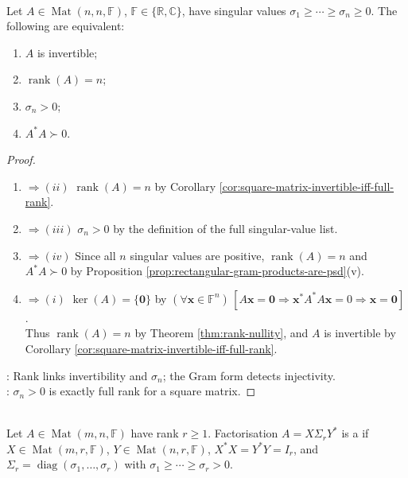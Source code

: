 \begin{corollary} \label{cor:square-invertibility-singular-value-dictionary} \\
Let $A\in\operatorname{Mat}(n,n,\mathbb{F})$, $\mathbb{F}\in\{\mathbb{R},\mathbb{C}\}$, have singular values $\sigma_1\geq\cdots\geq\sigma_n\geq0$. The following are equivalent:
\begin{enumerate}[label=(\roman*)]
\setlength{\itemsep}{0pt}
\item $A$ is invertible;
\item $\operatorname{rank}(A)=n$;
\item $\sigma_n>0$;
\item $A^*A\succ0$.
\end{enumerate}
\begin{proof}
\begin{enumerate}[label=(\roman*)]
\setlength{\itemsep}{0pt}
\item[$(i)$] $\Rightarrow (ii)$ $\operatorname{rank}(A)=n$ by Corollary \ref{cor:square-matrix-invertible-iff-full-rank}.
\item[$(ii)$] $\Rightarrow (iii)$ $\sigma_n>0$ by the definition of the full singular-value list.
\item[$(iii)$] $\Rightarrow (iv)$ Since all $n$ singular values are positive, $\operatorname{rank}(A)=n$ and $A^*A\succ0$ by Proposition \ref{prop:rectangular-gram-products-are-psd}(v).
\item[$(iv)$] $\Rightarrow (i)$ $\ker(A)=\{\mathbf{0}\}$ by $(\forall\mathbf{x}\in\mathbb{F}^n)\,[A\mathbf{x}=\mathbf{0}\Rightarrow\mathbf{x}^*A^*A\mathbf{x}=0\Rightarrow\mathbf{x}=\mathbf{0}]$.\\
Thus $\operatorname{rank}(A)=n$ by Theorem \ref{thm:rank-nullity}, and $A$ is invertible by Corollary \ref{cor:square-matrix-invertible-iff-full-rank}.
\end{enumerate}
: Rank links invertibility and $\sigma_n$; the Gram form detects injectivity.\\
: $\sigma_n>0$ is exactly full rank for a square matrix.
\end{proof}
\end{corollary}

\begin{definition} \label{def:compact-singular-value-decomposition} \\
Let $A\in\operatorname{Mat}(m,n,\mathbb{F})$ have rank $r\geq1$. Factorisation $A=X\Sigma_rY^*$ is a  if $X\in\operatorname{Mat}(m,r,\mathbb{F})$, $Y\in\operatorname{Mat}(n,r,\mathbb{F})$, $X^*X=Y^*Y=I_r$, and $\Sigma_r=\operatorname{diag}(\sigma_1,\ldots,\sigma_r)$ with $\sigma_1\geq\cdots\geq\sigma_r>0$.
\end{definition}


